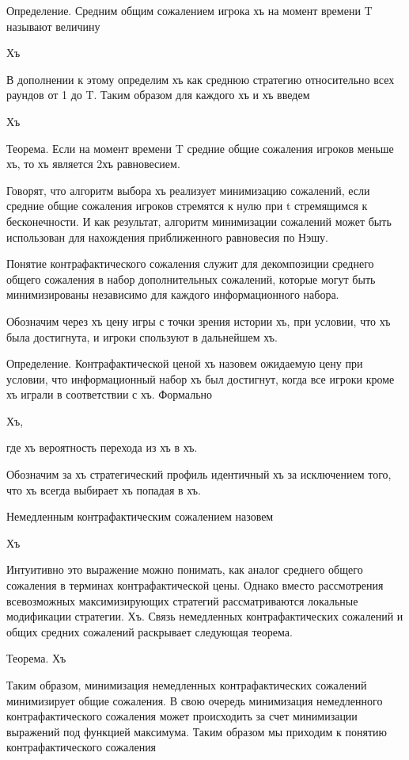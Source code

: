 Определение. Средним общим сожалением игрока хъ на момент времени T называют величину 

Хъ 

В дополнении к этому определим хъ как среднюю стратегию относительно всех раундов от 1 до T. Таким образом для каждого хъ и хъ введем 

Хъ 

Теорема. Если на момент времени T средние общие сожаления игроков меньше хъ, то хъ является 2хъ равновесием. 

Говорят, что алгоритм выбора хъ реализует минимизацию сожалений, если средние общие сожаления игроков стремятся к нулю при t стремящимся к бесконечности. И как результат, алгоритм минимизации сожалений может быть использован для нахождения приближенного равновесия по Нэшу. 

Понятие контрафактического сожаления служит для декомпозиции среднего общего сожаления в набор дополнительных сожалений, которые могут быть минимизированы независимо для каждого информационного набора.  

Обозначим через хъ цену игры с точки зрения истории хъ, при условии, что хъ была достигнута, и игроки спользуют в дальнейшем хъ. 

Определение. Контрафактической ценой хъ назовем ожидаемую цену при условии, что информационный набор хъ был достигнут, когда все игроки кроме хъ играли в соответствии с хъ. Формально 

Хъ, 

где хъ вероятность перехода из хъ в хъ. 

Обозначим за хъ стратегический профиль идентичный хъ за исключением того, что хъ всегда выбирает хъ попадая в хъ. 

Немедленным контрафактическим сожалением назовем 

Хъ 

Интуитивно это выражение можно понимать, как аналог среднего общего сожаления в терминах контрафактической цены. Однако вместо рассмотрения всевозможных максимизирующих стратегий рассматриваются локальные модификации стратегии. Хъ. Связь немедленных контрафактических сожалений и общих средних сожалений раскрывает следующая теорема. 

Теорема. Хъ 

Таким образом, минимизация немедленных контрафактических сожалений минимизирует общие сожаления. В свою очередь минимизация немедленного контрафактического сожаления может происходить за счет минимизации выражений под функцией максимума. Таким образом мы приходим к понятию контрафактического сожаления 

